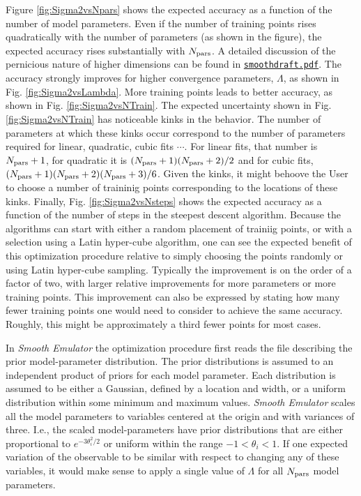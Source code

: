 \documentclass[UserManual.tex]{subfiles}
\begin{document}
Figure \ref{fig:Sigma2vsNpars} shows the expected accuracy as a function of the number of model parameters. Even if the number of training points rises quadratically with the number of parameters (as shown in the figure), the expected accuracy rises substantially with $N_{\rm pars}$. A detailed discussion of the pernicious nature of higher dimensions can be found in  \href{./smoothdraft.pdf}{{\tt smoothdraft.pdf}}. The accuracy strongly improves for higher convergence parameters, $\Lambda$, as shown in Fig. \ref{fig:Sigma2vsLambda}. More training points leads to better accuracy, as shown in Fig. \ref{fig:Sigma2vsNTrain}. The expected uncertainty shown in Fig. \ref{fig:Sigma2vsNTrain} has noticeable kinks in the behavior. The number of parameters at which these kinks occur correspond to the number of parameters required for linear, quadratic, cubic fits $\cdots$. For linear fits, that number is $N_{\rm pars}+1$, for quadratic it is $(N_{\rm pars}+1)(N_{\rm pars}+2)/2$ and for cubic fits, $(N_{\rm pars}+1)(N_{\rm pars}+2)(N_{\rm pars}+3)/6$. Given the kinks, it might behoove the User to choose a number of traininig points corresponding to the locations of these kinks. Finally, Fig. \ref{fig:Sigma2vsNsteps} shows the expected accuracy as a function of the number of steps in the steepest descent algorithm. Because the algorithms can start with either a random placement of trainiig points, or with a selection using a Latin hyper-cube algorithm, one can see the expected benefit of this optimization procedure relative to simply choosing the points randomly or using Latin hyper-cube sampling. Typically the improvement is on the order of a factor of two, with larger relative improvements for more parameters or more training points. This improvement can also be expressed by stating how many fewer training points one would need to consider to achieve the same accuracy. Roughly, this might be approximately a third fewer points for most cases.

In {\it Smooth Emulator} the optimization procedure first reads the file describing the prior model-parameter distribution. The prior distributions is assumed to an independent product of priors for each model parameter. Each distribution is assumed to be either a Gaussian, defined by a location and width, or a uniform distribution within some minimum and maximum values. {\it Smooth Emulator} scales all the model parameters to variables centered at the origin and with variances of three. I.e., the scaled model-parameters have prior distributions that are either proportional to $e^{-3\theta_i^2/2}$ or uniform within the range $-1<\theta_i<1$. If one expected variation of the observable to be similar with respect to changing any of these variables, it would make sense to apply a single value of $\Lambda$ for all $N_{\rm pars}$ model parameters.
\end{document}
